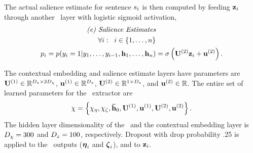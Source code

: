 The actual salience
estimate for sentence $s_i$ is then computed by feeding $\mathbf{z}_i$
through another \feedforward~layer with logistic sigmoid activation,
\begin{align}
    \textit{(e) Salience Estimates} & \nonumber\\
    \forall i : \;\; i \in \{1,\ldots,n\}& \nonumber \\
 p_i = p(y_i =1|y_1,\ldots,y_{i-1}, \mathbf{h}_1,\ldots,\mathbf{h}_n) &= \sigma\left(\mathbf{U}^{(2)}\mathbf{z}_i + \mathbf{u}^{(2)}  \right).
\end{align}

The contextual embedding and salience estimate layers have parameters are $\mathbf{U}^{(1)} \in \mathbb{R}^{{D_{z}} \times 2 {D_{\chi}}}$, $\mathbf{u}^{(1)} \in \mathbb{R}^{{D_{z}}}$, $\mathbf{U}^{(2)} \in \mathbb{R}^{1 \times {D_{z}}}$, and $\mathbf{u}^{(2)}\in \mathbb{R}$.
The entire set of learned parameters for the \clext~extractor are
\[
    \chi = \left\{ 
    \chi_\eta, \chi_\zeta,
    \boldsymbol{\bar{\mathbf{h}}}_0,
    \mathbf{U}^{(1)}, \mathbf{u}^{(1)}, \mathbf{U}^{(2)}, \mathbf{u}^{(2)}\right\}.
\]
The hidden layer dimensionality of the \gru~and the contextual embedding layer
is 
${D_{\chi}} = 300$ and ${D_{z}}=100$, respectively.
{\color{red}Dropout with drop probability .25 is applied to the \gru~outputs
($\boldsymbol{\eta}_i$ and $\boldsymbol{\zeta}_i$),   and to $\mathbf{z}_i$.}




